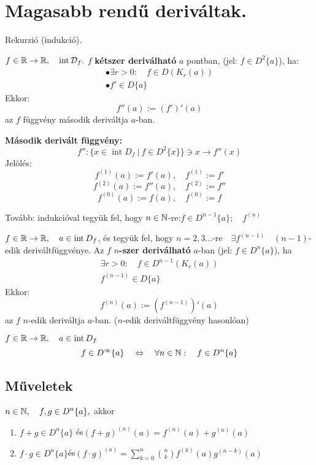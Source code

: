 \documentclass[a4paper,11.5pt]{article}
\DeclareMathOperator{\Int}{int}
\begin{document}
	\section{Magasabb rendű deriváltak.}
	\begin{revision}
		Rekurzió (indukció).
	\end{revision}
	\begin{definition}
		$f\in\R\to\R, \quad \Int \mathcal{D}_f.$ $f$ \textbf{kétszer deriválható} $a$ pontban, (jel: $f\in D^2\{a\}$), ha:
		\[\begin{gathered}
		\bullet\exists r>0:\quad f\in D(K_r(a))\\
		\bullet f'\in D\{a\}
		\end{gathered}\]
		Ekkor:
		\[ f''(a):=(f')'(a) \]
		az $f$ függvény második deriváltja $a$-ban.
		
		\bigskip
		\textbf{Második derivált függvény:}
		\[ f'':\{x\in\Int D_f\ |\ f\in D^2\{x\}\}\ni x\to f''(x) \]
		Jelölés:
		\[ f^{(1)}(a):=f'(a),\quad f^{(1)}:=f' \]
		\[ f^{(2)}(a):=f''(a),\quad f^{(2)}:=f'' \]
		\[ f^{(0)}(a):=f(a),\quad f^{(0)}:=f \]
	\end{definition}
	Tovább: indukcióval tegyük fel, hogy $n\in\mathbb{N}$-re:\quad $f\in D^{n-1}\{a\};\quad f^{(n)}$
	\begin{definition}
		$f\in\R\to\R,\quad a\in\Int D_f$, és tegyük fel, hogy $n=2,3\ldots$-re$ \quad \exists f^{(n-1)}$\ \ $(n-1)$-edik deriváltfüggvénye. Az $f$ \textbf{$n$-szer deriválható} $a$-ban (jel: $f\in D^n\{a\}$), ha
		\begin{gather}
			\exists r>0:\quad f\in D^{n-1}(K_r(a))\\
			f^{(n-1)}\in D\{a\}
		\end{gather}
		Ekkor:
		\[ f^{(n)}(a):=\left(f^{(n-1)}\right)'(a) \]
		az $f$ $n$-edik deriváltja $a$-ban. ($n$-edik deriváltfüggvény hasonlóan)
	\end{definition}
	\begin{definition}
		$f\in\R\to\R,\quad a\in\Int D_f$
		\[ f\in D^{\infty}\{a\}\quad \Leftrightarrow \quad \forall n\in\mathbb{N}:\quad f\in D^n\{a\} \]
	\end{definition}
	\subsection{Műveletek}
	\begin{theorem}
		$n\in\mathbb{N},\quad f,g\in D^n\{a\},$ akkor
		\begin{enumerate}
			\item $\displaystyle f+g\in D^n\{a\}$ \quad és\quad  $(f+g)^{(n)}(a)=f^{(n)}(a)+g^{(n)}(a)$
			\item $\displaystyle f\cdot g\in D^n\{a\}$\quad  és\quad  $(f\cdot g)^{(a)}=\displaystyle \sum_{k=0}^n\binom{n}{k}f^{(k)}(a)g^{(n-k)}(a) $
		\end{enumerate}
	\end{theorem}
\end{document}
